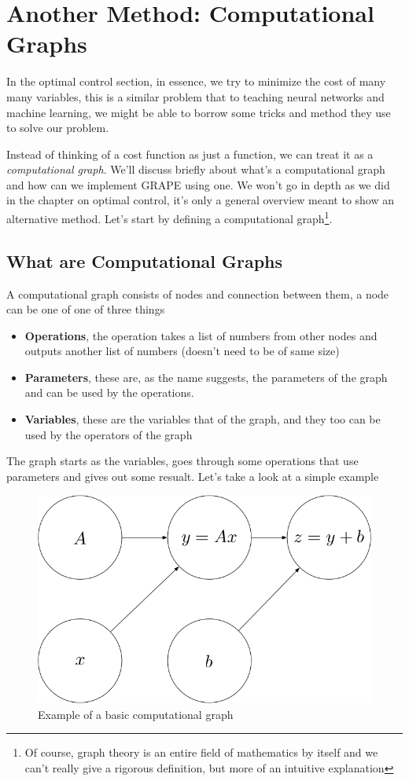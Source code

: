 \chapter{Another Method: Computational Graphs}
In the optimal control section, in essence, we try to minimize the cost of many many variables, this is a similar problem that to teaching neural networks and machine learning, we might be able to borrow some tricks and method they use to solve our problem.

Instead of thinking of a cost function as just a function, we can treat it as a \textit{computational graph}. We'll discuss briefly about what's a computational graph and how can we implement GRAPE using one. We won't go in depth as we did in the chapter on optimal control, it's only a general overview meant to show an alternative method. Let's start by defining a computational graph\footnote{Of course, graph theory is an entire field of mathematics by itself and we can't really give a rigorous definition, but more of an intuitive explanation}.

\section{What are Computational Graphs}
A computational graph consists of nodes and connection between them, a node can be one of one of three things
\begin{itemize}
    \item \textbf{Operations}, the operation takes a list of numbers from other nodes and outputs another list of numbers (doesn't need to be of same size) %
    \item \textbf{Parameters}, these are, as the name suggests, the parameters of the graph and can be used by the operations.
    \item \textbf{Variables}, these are the variables that of the graph, and they too can be used by the operators of the graph
\end{itemize}
The graph starts as the variables, goes through some operations that use parameters and gives out some resualt. Let's take a look at a simple example

\begin{figure}[H]
    \centering
    \includegraphics[width=0.4\columnwidth]{gfx/Example-comp-graph.png}
    \caption{Example of a basic computational graph}
    \label{fig:example-computational-graph}
\end{figure}

